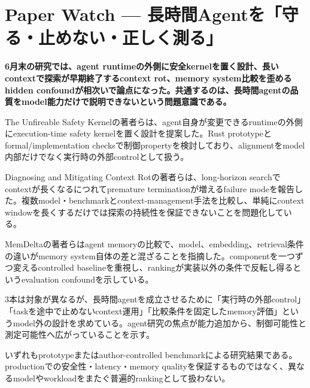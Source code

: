 \section{Paper Watch — 長時間Agentを「守る・止めない・正しく測る」}
\label{pkg:paper-watch-june}
\noindent\textbf{6月末の研究では、agent runtimeの外側に安全kernelを置く設計、長いcontextで探索が早期終了するcontext rot、memory system比較を歪めるhidden confoundが相次いで論点になった。共通するのは、長時間agentの品質をmodel能力だけで説明できないという問題意識である。}\autocite{src-246f07f416dc,src-644589094c65,src-8603fd60d637}

The Unfireable Safety Kernelの著者らは、agent自身が変更できるruntimeの外側にexecution-time safety kernelを置く設計を提案した。Rust prototypeとformal/implementation checksで制御propertyを検討しており、alignmentをmodel内部だけでなく実行時の外部controlとして扱う。\autocite{src-644589094c65}


Diagnosing and Mitigating Context Rotの著者らは、long-horizon searchでcontextが長くなるにつれてpremature terminationが増えるfailure modeを報告した。複数model・benchmarkとcontext-management手法を比較し、単純にcontext windowを長くするだけでは探索の持続性を保証できないことを問題化している。\autocite{src-8603fd60d637}


MemDeltaの著者らはagent memoryの比較で、model、embedding、retrieval条件の違いがmemory system自体の差と混ざることを指摘した。componentを一つずつ変えるcontrolled baselineを重視し、rankingが実装以外の条件で反転し得るというevaluation confoundを示している。\autocite{src-246f07f416dc}


3本は対象が異なるが、長時間agentを成立させるために「実行時の外部control」「taskを途中で止めないcontext運用」「比較条件を固定したmemory評価」というmodel外の設計を求めている。agent研究の焦点が能力追加から、制御可能性と測定可能性へ広がっていることを示す。\autocite{src-246f07f416dc,src-644589094c65,src-8603fd60d637}


\begin{claimboundary}
いずれもprototypeまたはauthor-controlled benchmarkによる研究結果である。productionでの安全性・latency・memory qualityを保証するものではなく、異なるmodelやworkloadをまたぐ普遍的rankingとして扱わない。\autocite{src-246f07f416dc,src-644589094c65,src-8603fd60d637}
\end{claimboundary}
